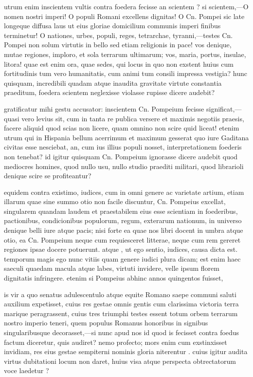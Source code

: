  utrum enim inscientem vultis contra foedera fecisse an scientem ? si scientem,—O nomen nostri imperi! O populi Romani excellens dignitas! O Cn. Pompei sic late longeque diffusa laus ut eius gloriae domicilium communis imperi finibus terminetur! O nationes, urbes, populi, reges, tetrarchae, tyranni,—testes Cn. Pompei non solum virtutis in bello sed etiam religionis in pace! vos denique, mutae regiones, imploro, et sola terrarum ultimarum; vos, maria, portus, insulae, litora! quae est enim ora, quae sedes, qui locus in quo non exstent huius cum fortitudinis tum vero humanitatis, cum animi tum consili impressa vestigia? hunc quisquam, incredibili quadam atque inaudita gravitate virtute constantia praeditum, foedera scientem neglexisse violasse rupisse dicere audebit?

 gratificatur mihi gestu accusator: inscientem Cn. Pompeium fecisse significat,—quasi vero levius sit, cum in tanta re publica versere et maximis negotiis praesis, facere aliquid quod scias non licere, quam omnino non scire quid liceat! etenim utrum qui in Hispania bellum acerrimum et maximum gesserat quo iure Gaditana civitas esse nesciebat, an, cum ius illius populi nosset, interpretationem foederis non tenebat? id igitur quisquam Cn. Pompeium ignorasse dicere audebit quod mediocres homines, quod nullo usu, nullo studio praediti militari, quod librarioli denique scire se profiteantur?

 equidem contra existimo, iudices, cum in omni genere ac varietate artium, etiam illarum quae sine summo otio non facile discuntur, Cn. Pompeius excellat, singularem quandam laudem et praestabilem eius esse scientiam in foederibus, pactionibus, condicionibus populorum, regum, exterarum nationum, in universo denique belli iure atque pacis; nisi forte ea quae nos libri docent in umbra atque otio, ea Cn. Pompeium neque cum requiesceret litterae, neque cum rem gereret regiones ipsae docere potuerunt. atque , ut ego sentio, iudices, causa dicta est. temporum magis ego nunc vitiis quam genere iudici plura dicam; est enim haec saeculi quaedam macula atque labes, virtuti invidere, velle ipsum florem dignitatis infringere. etenim si Pompeius abhinc annos quingentos fuisset,

 is vir a quo senatus adulescentulo atque equite Romano saepe communi saluti auxilium expetisset, cuius res gestae omnis gentis cum clarissima victoria terra marique peragrassent, cuius tres triumphi testes essent totum orbem terrarum nostro imperio teneri, quem populus Romanus honoribus in signibus singularibusque decorasset,—si nunc apud nos id quod is fecisset contra foedus factum diceretur, quis audiret? nemo profecto; mors enim cum exstinxisset invidiam, res eius gestae sempiterni nominis gloria niterentur . cuius igitur audita virtus dubitationi locum non daret, huius visa atque perspecta obtrectatorum voce laedetur ?

